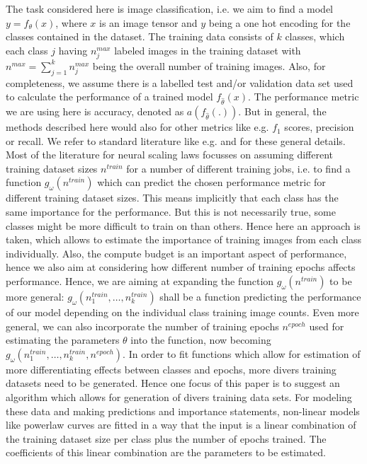 \documentclass{article} %
\begin{document}
The task considered here is image classification, i.e. we aim to find a model $y = f_{\theta}(x)$, where $x$ is an image tensor and $y$ being a one hot encoding for the classes contained in the dataset.
The training data consists of $k$ classes, which each class $j$ having $n_j^{max}$ labeled images in the training dataset with $n^{max} = \sum_{j= 1}^k n_j^{max}$ being the overall number of training images.
Also, for completeness, we assume there is a labelled test and/or validation data set used to calculate the performance of a trained model $f_{\hat{\theta}}(x)$.
The performance metric we are using here is accuracy, denoted as $a(f_{\hat{\theta}}(.))$. But in general, the methods described here would also for other metrics like e.g. $f_1$ scores, precision or recall.
We refer to standard literature like e.g. \cite{Goodfellowetal2016} and \cite{Bishop2006PatternRecog} for these general details.
Most of the literature for neural scaling laws focusses on assuming different training dataset sizes $n^{train}$ for a number of different training jobs, i.e. to find a function $g_{\omega}(n^{train})$ which can predict the chosen performance metric for different training dataset sizes.
This means implicitly that each class has the same importance for the performance.
But this is not necessarily true, some classes might be more difficult to train on than others.
Hence here an approach is taken, which allows to estimate the importance of training images from each class individually.
Also, the compute budget is an important aspect of performance, hence we also aim at considering how different number of training epochs affects performance.
Hence, we are aiming at expanding the function $g_{\omega}(n^{train})$ to be more general: $g_{\omega}(n_1^{train}, \dots, n_k^{train})$ shall be a function predicting the performance of our model depending on the individual class training image counts.
Even more general, we can also incorporate the number of training epochs $n^{epoch}$ used for estimating the parameters $\theta$ into the function, now becoming $g_{\omega}(n_1^{train}, \dots, n_k^{train}, n^{epoch})$.
In order to fit functions which allow for estimation of more differentiating effects between classes and epochs, more divers training datasets need to be generated.
Hence one focus of this paper is to suggest an algorithm which allows for generation of divers training data sets.
For modeling these data and making predictions and importance statements, non-linear models like powerlaw curves are fitted in a way that the input is a linear combination of the training dataset size per class plus the number of epochs trained.
The coefficients of this linear combination are the parameters to be estimated.
\end{document}
